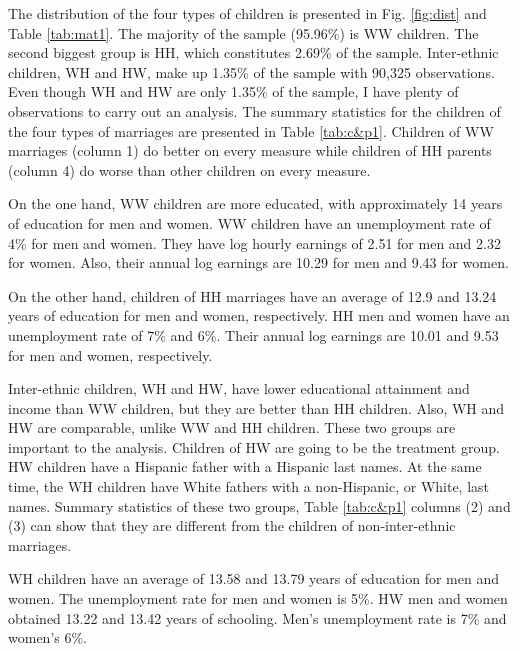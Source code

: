 \documentclass[a4paper,fleqn]{cas-sc}
\begin{document}
The distribution of the four types of children is presented in Fig. \ref{fig:dist} and Table \ref{tab:mat1}. The majority of the sample (95.96\%) is WW children. The second biggest group is HH, which constitutes 2.69\% of the sample. Inter-ethnic children, WH and HW, make up 1.35\% of the sample with 90,325 observations. Even though WH and HW are only 1.35\% of the sample, I have plenty of observations to carry out an analysis. The summary statistics for the children of the four types of marriages are presented in Table \ref{tab:c&p1}. Children of WW marriages (column 1) do better on every measure while children of HH parents (column 4) do worse than other children on every measure.




On the one hand, WW children are more educated, with approximately 14 years of education for men and women. WW children have an unemployment rate of 4\% for men and women. They have log hourly earnings of 2.51 for men and 2.32 for women. Also, their annual log earnings are 10.29 for men and 9.43 for women.

On the other hand, children of HH marriages have an average of 12.9 and 13.24 years of education for men and women, respectively. HH men and women have an unemployment rate of 7\% and 6\%. Their annual log earnings are 10.01 and 9.53 for men and women, respectively.

Inter-ethnic children, WH and HW, have lower educational attainment and income than WW children, but they are better than HH children. Also, WH and HW are comparable, unlike WW and HH children. These two groups are important to the analysis. Children of HW are going to be the treatment group. HW children have a Hispanic father with a Hispanic last names. At the same time, the WH children have White fathers with a non-Hispanic, or White, last names. Summary statistics of these two groups, Table \ref{tab:c&p1} columns (2) and (3) can show that they are different from the children of non-inter-ethnic marriages.




WH children have an average of 13.58 and 13.79 years of education for men and women. The unemployment rate for men and women is 5\%. HW men and women obtained 13.22 and 13.42 years of schooling. Men's unemployment rate is 7\% and women's 6\%.
\end{document}
